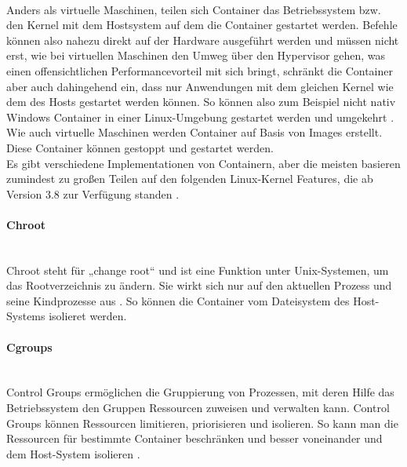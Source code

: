 \paragraph{}
\noindent Anders als virtuelle Maschinen, teilen sich Container das Betriebssystem bzw. den Kernel mit dem Hostsystem auf dem die Container gestartet werden. Befehle können also nahezu direkt auf der Hardware ausgeführt werden und müssen nicht erst, wie bei virtuellen Maschinen den Umweg über den Hypervisor gehen, was einen offensichtlichen Performancevorteil mit sich bringt, schränkt die Container aber auch dahingehend ein, dass nur Anwendungen mit dem gleichen Kernel wie dem des Hosts gestartet werden können. So können also zum Beispiel nicht nativ Windows Container in einer Linux-Umgebung gestartet werden und umgekehrt \cite{7092949}. Wie auch virtuelle Maschinen werden Container auf Basis von Images erstellt. Diese Container können gestoppt und gestartet werden.\\ Es gibt verschiedene Implementationen von Containern, aber die meisten basieren zumindest zu großen Teilen auf den folgenden Linux-Kernel Features, die ab Version 3.8 zur Verfügung standen \cite{RaRo}.

\paragraph{Chroot} \mbox{} \\
\noindent Chroot steht für „change root“ und ist eine Funktion unter Unix-Systemen, um das Rootverzeichnis zu ändern. Sie wirkt sich nur auf den aktuellen Prozess und seine Kindprozesse aus \cite{wiki:chroot}. So können die Container vom Dateisystem des Host-Systems isolieret werden. 

\paragraph{Cgroups} \mbox{} \\
\noindent Control Groups ermöglichen die Gruppierung von Prozessen, mit deren Hilfe das Betriebssystem den Gruppen Ressourcen zuweisen und verwalten kann. Control Groups können Ressourcen limitieren, priorisieren und isolieren. So kann man die Ressourcen für bestimmte Container beschränken und besser voneinander und dem Host-System isolieren \cite{7158965}.

